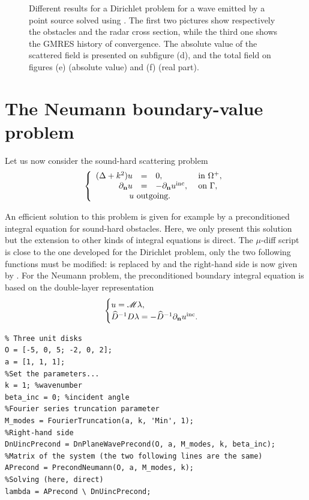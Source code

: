 \begin{figure}
\caption{Different results for a Dirichlet problem for a wave emitted by a point source solved using \mudiff. The first two pictures show respectively the obstacles and the radar cross section, while the third one shows the GMRES history of convergence. The absolute value of the scattered field is presented on subfigure (d), and the total field on figures (e) (absolute value) and (f) (real part).}
\label{fig:exampleDirichletPS}
\end{figure}

\newpage
\section{The Neumann boundary-value problem}

Let us now consider the sound-hard scattering problem
$$
\left\{\begin{array}{r c l l}
(\Delta +k^2)u & = & 0, & \text{ in }\Omegaps,\\
\dn u & = & -\dn \uinc, & \text{ on }\Gamma,\\
\multicolumn{4}{l}{\qquad \qquad u \text{ outgoing}.}
\end{array}\right.
$$

An efficient solution to this problem is given for example by a preconditioned integral equation for sound-hard obstacles.
Here, we only present this solution but the extension to other kinds of integral equations is direct.
 The $\mu$-diff script is close to the one developed for the Dirichlet problem, only the two following functions must
  be modified: \PrecondDirichlet is replaced by \PrecondNeumann and the right-hand side \PlaneWavePrecond is now given by
   \DnPlaneWavePrecond. For the Neumann problem, the preconditioned boundary integral equation is based on the double-layer representation
$$
\begin{cases}
u = {\mathscr M}\lambda,\\
\widehat{D}^{-1} D \lambda = -\widehat{D}^{-1}\partial_{\mathbf{n}}u^{\textrm{inc}}.
\end{cases}
$$
\begin{lstlisting}
% Three unit disks 
O = [-5, 0, 5; -2, 0, 2];
a = [1, 1, 1];
%Set the parameters...
k = 1; %wavenumber
beta_inc = 0; %incident angle
%Fourier series truncation parameter
M_modes = FourierTruncation(a, k, 'Min', 1);
%Right-hand side
DnUincPrecond = DnPlaneWavePrecond(O, a, M_modes, k, beta_inc);
%Matrix of the system (the two following lines are the same)
APrecond = PrecondNeumann(O, a, M_modes, k);
%Solving (here, direct)
lambda = APrecond \ DnUincPrecond;
\end{lstlisting}
\medskip

